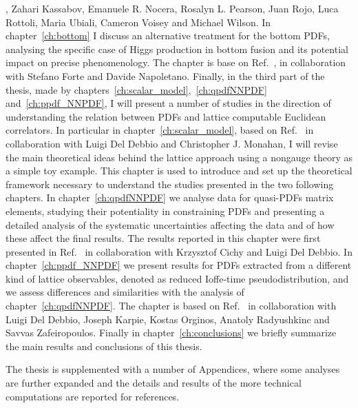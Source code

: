 , Zahari Kassabov, Emanuele R. Nocera, Rosalyn L. Pearson, Juan Rojo, Luca Rottoli,
Maria Ubiali, Cameron Voisey and Michael Wilson.
In chapter~\ref{ch:bottom} I discuss an alternative treatment for the bottom PDFs, analysing the specific case of
Higgs production in bottom fusion and its potential impact on precise phenomenology. 
The chapter is base on Ref.~\cite{Forte:2019hjc}, in collaboration with Stefano Forte and Davide Napoletano.
%
Finally, in the third part of the thesis, made by chapters~\ref{ch:scalar_model},~\ref{ch:qpdfNNPDF} and~\ref{ch:ppdf_NNPDF}, 
I will present a number of studies in the direction of understanding the relation between PDFs and lattice computable
Euclidean correlators.
In particular in chapter~\ref{ch:scalar_model}, based on Ref.~\cite{DelDebbio:2020cbz}
in collaboration with Luigi Del Debbio and Christopher J. Monahan,
I will revise the main theoretical ideas behind the lattice approach
using a nongauge theory as a simple toy example. This chapter is used to introduce and set up the theoretical framework necessary
to understand the studies presented in the two following chapters.
In chapter~\ref{ch:qpdfNNPDF} we analyse data for quasi-PDFs matrix elements, studying their potentiality
in constraining PDFs and presenting a detailed analysis of the systematic uncertainties affecting the data and of how
these affect the final results. The results reported in this chapter were first presented in Ref.~\cite{Cichy:2019ebf}
in collaboration with Krzysztof Cichy and Luigi Del Debbio.
In chapter~\ref{ch:ppdf_NNPDF} we present results for PDFs extracted from a different kind of lattice 
observables, denoted as reduced Ioffe-time pseudodistribution, and we assess differences and similarities with
the analysis of chapter~\ref{ch:qpdfNNPDF}. The chapter is based on Ref.~\cite{DelDebbio:2020rgv} 
in collaboration with Luigi Del Debbio, Joseph Karpie, Kostas Orginos, Anatoly
Radyushkinc and Savvas Zafeiropoulos.
Finally in chapter~\ref{ch:conclusions} we briefly summarize the main results and conclusions of this thesis. 

The thesis is supplemented with a number of Appendices, where some analyses are further expanded and 
the details and results of the more technical computations are reported for references. 




